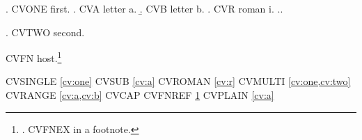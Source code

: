 
\usepackage{cleveref}

\ex.\label{cv:one} CVONE first.
\a.\label{cv:a} CVA letter a.
\b.\label{cv:b} CVB letter b.
\a.\label{cv:r} CVR roman i.
\z.\z.

\ex.\label{cv:two} CVTWO second.

CVFN host.\footnote{\ex.\label{cv:fn} CVFNEX in a footnote.

}

CVSINGLE \cref{cv:one} CVSUB \cref{cv:a} CVROMAN \cref{cv:r}
CVMULTI \cref{cv:one,cv:two} CVRANGE \cref{cv:a,cv:b}
CVCAP  CVFNREF \cref{cv:fn} CVPLAIN \ref{cv:a}


